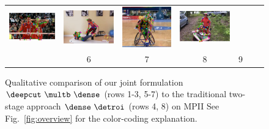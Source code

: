 \begin{figure}
\begin{tabular}{c c c c c c c}
    \includegraphics[height=0.140\linewidth]{imgidx_0092_sticks_detroi_mpii_multi.pdf}&
    \includegraphics[height=0.140\linewidth]{imgidx_1366_sticks_detroi_mpii_multi.pdf}& 
    \includegraphics[height=0.140\linewidth]{imgidx_0094_sticks_detroi_mpii_multi.pdf}&
    \includegraphics[height=0.140\linewidth]{imgidx_0903_sticks_detroi_mpii_multi.pdf}\\
  &6&7&8&9\\  
  \end{tabular}
  \caption{Qualitative comparison of our joint formulation
    $\deepcut~\multb~\dense$ (rows 1-3, 5-7) to the traditional
    two-stage approach $\dense~\detroi$ (rows 4, 8) on MPII
    See Fig.~\ref{fig:overview} for the color-coding explanation.
}
  \label{fig:qualitative_mpii}
\end{figure}

